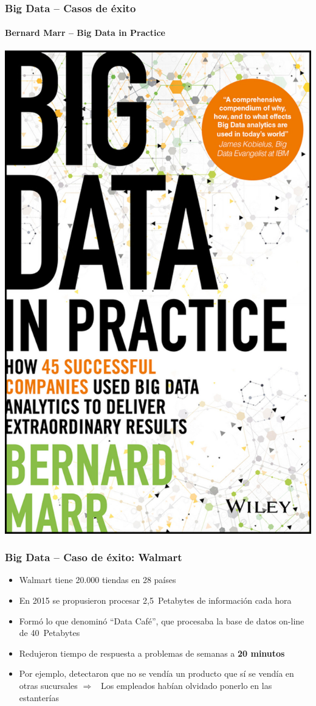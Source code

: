 \documentclass[14pt]{beamer}
\newcommand{\ra}{{\color{mdwrojo} $\Rightarrow${}~{}}}
\begin{document}
\begin{frame}
  \frametitle{Big Data -- Casos de éxito}
  \framesubtitle{Bernard Marr -- Big Data in Practice}
\centering\includegraphics[height=.8\textheight]{img/marr-book}
\end{frame}

\begin{frame}[allowframebreaks]
  \frametitle{Big Data -- Caso de éxito: Walmart}
  \begin{itemize}
  \item Walmart tiene 20.000 tiendas en 28 países
  \item En 2015 se propusieron procesar 2,5~Petabytes de información cada
    hora
  \item Formó lo que denominó ``Data Café'', que procesaba la base de datos
    on-line de 40~Petabytes
  \item Redujeron tiempo de respuesta a problemas de semanas a {\bf 20
      minutos}
  \item Por ejemplo, detectaron que no se vendía un producto que sí se
    vendía en otras sucursales \ra{} Los empleados habían olvidado ponerlo
    en las estanterías
  \end{itemize}
\end{frame}
\end{document}
